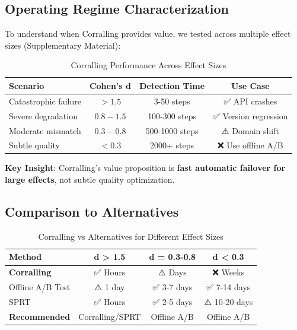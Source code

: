 \subsection{Operating Regime Characterization}

To understand when Corralling provides value, we tested across multiple effect sizes (Supplementary Material):

\begin{table}[h]
\centering
\caption{Corralling Performance Across Effect Sizes}
\label{tab:corralling_regimes}
\begin{tabular}{lccc}
\toprule
\textbf{Scenario} & \textbf{Cohen's d} & \textbf{Detection Time} & \textbf{Use Case} \\
\midrule
Catastrophic failure & $> 1.5$ & 3-50 steps & ✅ API crashes \\
Severe degradation & $0.8-1.5$ & 100-300 steps & ✅ Version regression \\
Moderate mismatch & $0.3-0.8$ & 500-1000 steps & ⚠️ Domain shift \\
Subtle quality & $< 0.3$ & 2000+ steps & ❌ Use offline A/B \\
\bottomrule
\end{tabular}
\end{table}

\textbf{Key Insight}: Corralling's value proposition is \textbf{fast automatic failover for large effects}, not subtle quality optimization.

\subsection{Comparison to Alternatives}

\begin{table}[h]
\centering
\caption{Corralling vs Alternatives for Different Effect Sizes}
\label{tab:comparison}
\begin{tabular}{lccc}
\toprule
\textbf{Method} & \textbf{d > 1.5} & \textbf{d = 0.3-0.8} & \textbf{d < 0.3} \\
\midrule
\textbf{Corralling} & ✅ Hours & ⚠️ Days & ❌ Weeks \\
Offline A/B Test & ⚠️ 1 day & ✅ 3-7 days & ✅ 7-14 days \\
SPRT & ✅ Hours & ✅ 2-5 days & ⚠️ 10-20 days \\
\midrule
\textbf{Recommended} & Corralling/SPRT & Offline A/B & Offline A/B \\
\bottomrule
\end{tabular}
\end{table}

